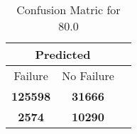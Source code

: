\begin{table}[] 
\caption{Confusion Matric for 80.0} 
\label{Table: Prediction Accuracy-None80.0SVMEKF-ignoreReflection-Reflection} 
\centering 
\begin{tabular} 
 {@{}ccc@{}} 
\toprule 
\multicolumn{2}{c}{\textbf{Predicted}}
 \\ \midrule 
\multicolumn{1}{|c|}{Failure} & 
\multicolumn{1}{c|}{No Failure}
 \\ \midrule 
\multicolumn{1}{|c|}{\color{green}\textbf{125598}} & 
\multicolumn{1}{c|}{\color{green}\textbf{31666}}
 \\ \midrule 
\multicolumn{1}{|c|}{\color{red}\textbf{2574}} & 
\multicolumn{1}{c|}{\color{red}\textbf{10290}}
 \\ \bottomrule 
\end{tabular} 
\end{table} 
